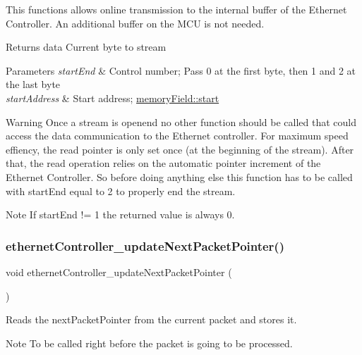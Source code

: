 This functions allows online transmission to the internal buffer of the Ethernet Controller. An additional buffer on the M\+CU is not needed. 

\begin{DoxyReturn}{Returns}
data Current byte to stream 
\end{DoxyReturn}

\begin{DoxyParams}{Parameters}
{\em start\+End} & Control number; Pass 0 at the first byte, then 1 and 2 at the last byte \\
\hline
{\em start\+Address} & Start address; \mbox{\hyperlink{structmemory_field_a171a2b5d11b1a5891c38a98ac731a161}{memory\+Field\+::start}} \\
\hline
\end{DoxyParams}
\begin{DoxyWarning}{Warning}
Once a stream is openend no other function should be called that could access the data communication to the Ethernet controller. For maximum speed effiency, the read pointer is only set once (at the beginning of the stream). After that, the read operation relies on the automatic pointer increment of the Ethernet Controller. So before doing anything else this function has to be called with start\+End equal to 2 to properly end the stream. 
\end{DoxyWarning}
\begin{DoxyNote}{Note}
If start\+End != 1 the returned value is always 0. 
\end{DoxyNote}
\mbox{\label{group__data__reception_ga9d6d9257b64641f2120cb99f31d66a0e}} 
\subsubsection{\texorpdfstring{ethernetController\_updateNextPacketPointer()}{ethernetController\_updateNextPacketPointer()}}
{\footnotesize\ttfamily void ethernet\+Controller\+\_\+update\+Next\+Packet\+Pointer (\begin{DoxyParamCaption}{ }\end{DoxyParamCaption})}



Reads the next\+Packet\+Pointer from the current packet and stores it. 

\begin{DoxyNote}{Note}
To be called right before the packet is going to be processed. 
\end{DoxyNote}

